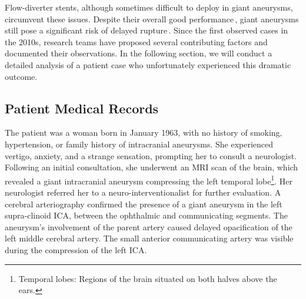 Flow-diverter stents, although sometimes difficult to deploy in giant aneurysms, circumvent these issues. Despite their overall good performance\,\cite{Kulcsar2011}, giant aneurysms still pose a significant risk of delayed rupture\,\cite{Kulcsar2011, Li2019, Rouchaud2016}. Since the first observed cases in the 2010s, research teams have proposed several contributing factors and documented their observations. In the following section, we will conduct a detailed analysis of a patient case who unfortunately experienced this dramatic outcome.


\subsection{Patient Medical Records}
The patient was a woman born in January 1963, with no history of smoking, hypertension, or family history of intracranial aneurysms. She experienced vertigo, anxiety, and a strange sensation, prompting her to consult a neurologist. Following an initial consultation, she underwent an MRI scan of the brain, which revealed a giant intracranial aneurysm compressing the left temporal lobe\footnote{Temporal lobes: Regions of the brain situated on both halves above the ears.}. Her neurologist referred her to a neuro-interventionalist for further evaluation. A cerebral arteriography confirmed the presence of a giant aneurysm in the left supra-clinoid ICA, between the ophthalmic and communicating segments. The aneurysm's involvement of the parent artery caused delayed opacification of the left middle cerebral artery. The small anterior communicating artery was visible during the compression of the left ICA\@.

